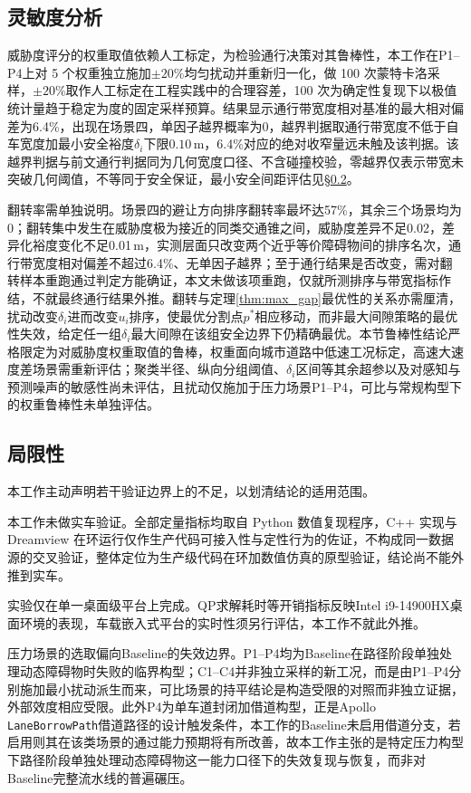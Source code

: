 \documentclass[a4paper,zihao=5]{ctexart}
\theoremstyle{definition}
\begin{document}
\subsection{灵敏度分析}
\label{subsec:exp_sensitivity}

威胁度评分的权重取值依赖人工标定，为检验通行决策对其鲁棒性，本工作在P1--P4上对 5 个权重独立施加$\pm 20\%$均匀扰动并重新归一化，做 100 次蒙特卡洛采样，$\pm 20\%$取作人工标定在工程实践中的合理容差，100 次为确定性复现下以极值统计量趋于稳定为度的固定采样预算。结果显示通行带宽度相对基准的最大相对偏差为6.4\%，出现在场景四，单因子越界概率为0，越界判据取通行带宽度不低于自车宽度加最小安全裕度$\delta_i$下限$0.10$\,m，6.4\%对应的绝对收窄量远未触及该判据。该越界判据与前文通行判据同为几何宽度口径、不含碰撞校验，零越界仅表示带宽未突破几何阈值，不等同于安全保证，最小安全间距评估见§\ref{subsec:exp_limitations}。

翻转率需单独说明。场景四的避让方向排序翻转率最坏达57\%，其余三个场景均为0；翻转集中发生在威胁度极为接近的同类交通锥之间，威胁度差异不足0.02，差异化裕度变化不足0.01\,m，实测层面只改变两个近乎等价障碍物间的排序名次，通行带宽度相对偏差不超过6.4\%、无单因子越界；至于通行结果是否改变，需对翻转样本重跑通过判定方能确证，本文未做该项重跑，仅就所测排序与带宽指标作结，不就最终通行结果外推。翻转与定理\ref{thm:max_gap}最优性的关系亦需厘清，扰动改变$\delta_i$进而改变$u_i$排序，使最优分割点$p^{*}$相应移动，而非最大间隙策略的最优性失效，给定任一组$\delta_i$最大间隙在该组安全边界下仍精确最优。本节鲁棒性结论严格限定为对威胁度权重取值的鲁棒，权重面向城市道路中低速工况标定，高速大速度差场景需重新评估；聚类半径、纵向分组阈值、$\delta_i$区间等其余超参以及对感知与预测噪声的敏感性尚未评估，且扰动仅施加于压力场景P1--P4，可比与常规构型下的权重鲁棒性未单独评估。

\subsection{局限性}
\label{subsec:exp_limitations}

本工作主动声明若干验证边界上的不足，以划清结论的适用范围。

本工作未做实车验证。全部定量指标均取自 Python 数值复现程序，C++ 实现与 Dreamview 在环运行仅作生产代码可接入性与定性行为的佐证，不构成同一数据源的交叉验证，整体定位为生产级代码在环加数值仿真的原型验证，结论尚不能外推到实车。

实验仅在单一桌面级平台上完成。QP求解耗时等开销指标反映Intel i9-14900HX桌面环境的表现，车载嵌入式平台的实时性须另行评估，本工作不就此外推。

压力场景的选取偏向Baseline的失效边界。P1--P4均为Baseline在路径阶段单独处理动态障碍物时失败的临界构型；C1--C4并非独立采样的新工况，而是由P1--P4分别施加最小扰动派生而来，可比场景的持平结论是构造受限的对照而非独立证据，外部效度相应受限。此外P4为单车道封闭加借道构型，正是Apollo \texttt{LaneBorrowPath}借道路径的设计触发条件，本工作的Baseline未启用借道分支，若启用则其在该类场景的通过能力预期将有所改善，故本工作主张的是特定压力构型下路径阶段单独处理动态障碍物这一能力口径下的失效复现与恢复，而非对Baseline完整流水线的普遍碾压。
\end{document}
